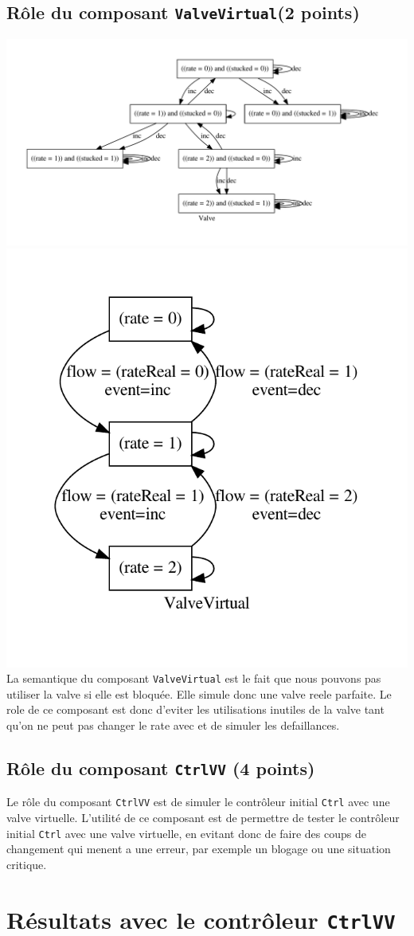 \documentclass[a4paper]{book}
\begin{document}
\subsection{Rôle du composant {\tt ValveVirtual}(2 points)}
\includegraphics[height=.2\textheight,width=.5\textwidth]{Graphs/Valve-modes.pdf}
\includegraphics[height=.2\textheight,width=.5\textwidth]{Graphs/ValveVirtual-modes.pdf}
La semantique du composant {\tt ValveVirtual} est le fait que nous pouvons pas utiliser
la valve si elle est bloquée. Elle simule donc une valve reele parfaite. Le role de ce
composant est donc d'eviter les utilisations inutiles de la valve tant qu'on ne peut pas
changer le rate avec et de simuler les defaillances.

\subsection{Rôle du composant {\tt CtrlVV} (4 points)}
Le rôle du composant {\tt CtrlVV} est de simuler le contrôleur initial {\tt Ctrl} avec une
valve virtuelle. L'utilité de ce composant est de permettre de tester le contrôleur initial
{\tt Ctrl} avec une valve virtuelle, en evitant donc de faire des coups de changement
qui menent a une erreur, par exemple un blogage ou une situation critique.


\section{Résultats avec le contrôleur {\tt CtrlVV}}
\end{document}
